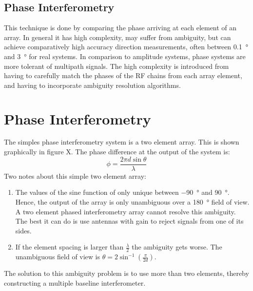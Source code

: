 \subsection{Phase Interferometry}
This technique is done by comparing the phase arriving at each element of an array. In general it has high complexity, may suffer from ambiguity, but can achieve comparatively high accuracy direction measurements, often between \SI{0.1}{\degree} and \SI{3}{\degree} for real systems. In comparison to amplitude systems, phase systems are more tolerant of multipath signals. The high complexity is introduced from having to carefully match the phases of the RF chains from each array element, and having to incorporate ambiguity resolution algorithms. 

\section{Phase Interferometry}
The simples phase interferometry system is a two element array. This is shown graphically in figure X. The phase difference at the output of the system is:
\begin{equation}
\phi = \frac{2 \pi d \sin \theta}{\lambda}
\end{equation}
Two notes about this simple two element array:
\begin{enumerate}
  \item The values of the sine function of only unique between \SI{-90}{\degree} and \SI{90}{\degree}. Hence, the output of the array is only unambiguous over a \SI{180}{\degree} field of view. A two element phased interferometry array cannot resolve this ambiguity. The best it can do is use antennas with gain to reject signals from one of its sides. 
 \item If the element spacing is larger than \(\frac{\lambda}{2}\) the ambiguity gets worse. The unambiguous field of view is \(\theta = 2 \sin^{-1}(\frac{\pi}{2d})\).
 \end{enumerate}
 The solution to this ambiguity problem is to use more than two elements, thereby constructing a multiple baseline interferometer. 
